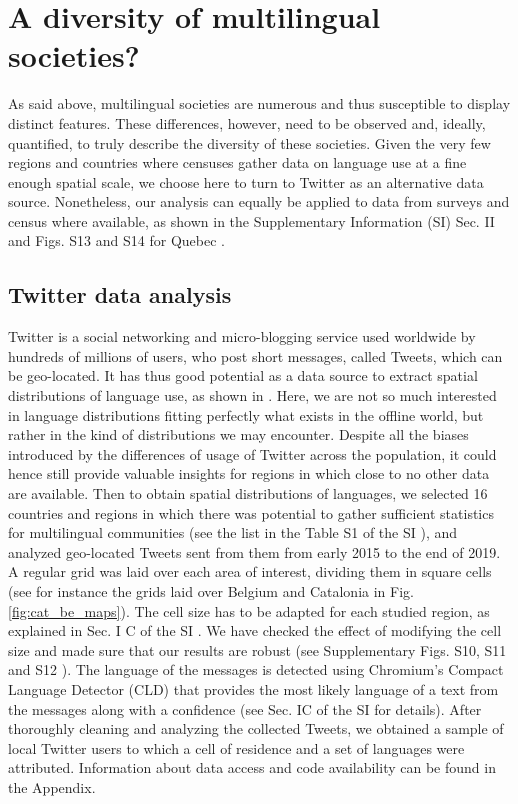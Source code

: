 \documentclass[../thesis.tex]{subfiles}
\begin{document}
\section{A diversity of multilingual societies?}
As said above, multilingual societies are numerous and thus susceptible to display
distinct features. These differences, however, need to be observed and, ideally,
quantified, to truly describe the diversity of these societies. Given the very few
regions and countries where censuses gather data on language use at a fine enough
spatial scale, we choose here to turn to Twitter as an alternative data source.
Nonetheless, our analysis can equally be applied to data from surveys and census where
available, as shown in the Supplementary Information (SI) Sec. II and Figs. S13 and S14
for Quebec \cite{supp}.


\subsection{Twitter data analysis}
Twitter is a social networking and micro-blogging service used worldwide by hundreds of
millions of users, who post short messages, called Tweets, which can be geo-located. It
has thus good potential as a data source to extract spatial distributions of language
use, as shown in
\cite{MocanuTwitterBabel2013,PavalanathanConfoundsConsequences2015,GoncalvesCrowdsourcingDialect2014,HuangUnderstandingRegional2016,GoncalvesMappingAmericanization2018,DunnMappingLanguages2020}.
Here, we are not so much interested in language distributions fitting perfectly what
exists in the offline world, but rather in the kind of distributions we may encounter.
Despite all the biases introduced by the differences of usage of Twitter across the
population, it could hence still provide valuable insights for regions in which close to
no other data are available. Then to obtain spatial distributions of languages, we
selected 16 countries and regions in which there was potential to gather sufficient
statistics for multilingual communities (see the list in the Table S1 of the SI
\cite{supp}), and analyzed geo-located Tweets sent from them from early 2015 to the end
of 2019. A regular grid was laid over each area of interest, dividing them in square
cells (see for instance the grids laid over Belgium and Catalonia in Fig.
\ref{fig:cat_be_maps}). The cell size has to be adapted for each studied
region, as explained in Sec. I C of the SI \cite{supp}. We have checked the effect of
modifying the cell size and made sure that our results are robust (see Supplementary
Figs. S10, S11 and S12 \cite{supp}). The language of the messages is detected using
Chromium's Compact Language Detector (CLD) that provides the most likely language of a
text from the messages along with a confidence (see Sec. IC of the SI \cite{supp} for
details). After thoroughly cleaning and analyzing the collected Tweets, we obtained a
sample of local Twitter users to which a cell of residence and a set of languages were
attributed. Information about data access and code availability can be found in the
Appendix.
\end{document}
